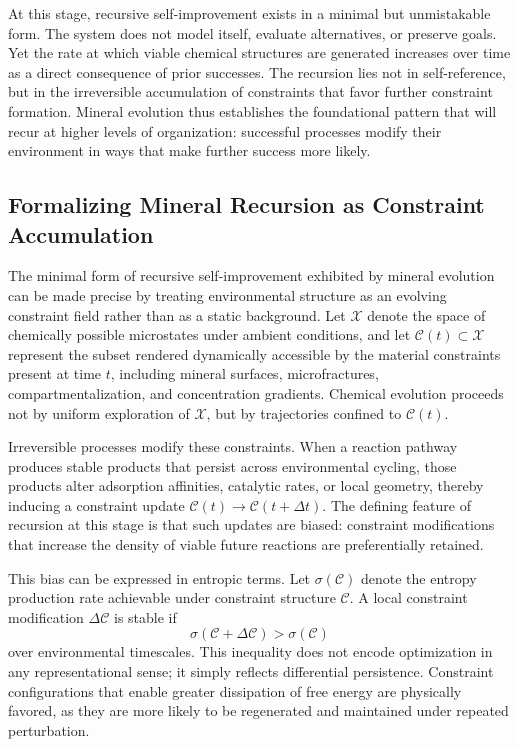 \documentclass[11pt]{article}
\begin{document}
At this stage, recursive self-improvement exists in a minimal but unmistakable form. The system does not model itself, evaluate alternatives, or preserve goals. Yet the rate at which viable chemical structures are generated increases over time as a direct consequence of prior successes. The recursion lies not in self-reference, but in the irreversible accumulation of constraints that favor further constraint formation. Mineral evolution thus establishes the foundational pattern that will recur at higher levels of organization: successful processes modify their environment in ways that make further success more likely.

\subsection{Formalizing Mineral Recursion as Constraint Accumulation}

The minimal form of recursive self-improvement exhibited by mineral evolution can be made precise by treating environmental structure as an evolving constraint field rather than as a static background. Let $\mathcal{X}$ denote the space of chemically possible microstates under ambient conditions, and let $\mathcal{C}(t) \subset \mathcal{X}$ represent the subset rendered dynamically accessible by the material constraints present at time $t$, including mineral surfaces, microfractures, compartmentalization, and concentration gradients. Chemical evolution proceeds not by uniform exploration of $\mathcal{X}$, but by trajectories confined to $\mathcal{C}(t)$.

Irreversible processes modify these constraints. When a reaction pathway produces stable products that persist across environmental cycling, those products alter adsorption affinities, catalytic rates, or local geometry, thereby inducing a constraint update $\mathcal{C}(t) \rightarrow \mathcal{C}(t + \Delta t)$. The defining feature of recursion at this stage is that such updates are biased: constraint modifications that increase the density of viable future reactions are preferentially retained.

This bias can be expressed in entropic terms. Let $\sigma(\mathcal{C})$ denote the entropy production rate achievable under constraint structure $\mathcal{C}$. A local constraint modification $\Delta \mathcal{C}$ is stable if
\begin{equation}
\sigma(\mathcal{C} + \Delta \mathcal{C}) > \sigma(\mathcal{C})
\end{equation}
over environmental timescales. This inequality does not encode optimization in any representational sense; it simply reflects differential persistence. Constraint configurations that enable greater dissipation of free energy are physically favored, as they are more likely to be regenerated and maintained under repeated perturbation.
\end{document}
